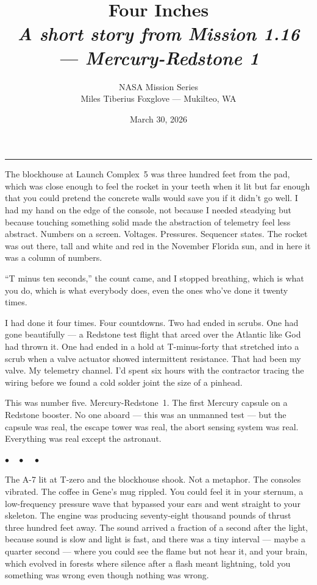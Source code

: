 \documentclass[12pt, letterpaper]{article}
\title{\Huge\textbf{Four Inches}\\[0.5em]\large\textit{A short story from Mission 1.16 --- Mercury-Redstone 1}}
\author{NASA Mission Series\\[0.3em]\small Miles Tiberius Foxglove --- Mukilteo, WA}
\date{March 30, 2026}
\begin{document}
\maketitle
\thispagestyle{empty}

\vspace{1em}
\noindent\rule{\textwidth}{0.4pt}
\vspace{1em}

\noindent The blockhouse at Launch Complex~5 was three hundred feet from the pad, which was close enough to feel the rocket in your teeth when it lit but far enough that you could pretend the concrete walls would save you if it didn't go well. I had my hand on the edge of the console, not because I needed steadying but because touching something solid made the abstraction of telemetry feel less abstract. Numbers on a screen. Voltages. Pressures. Sequencer states. The rocket was out there, tall and white and red in the November Florida sun, and in here it was a column of numbers.

``T minus ten seconds,'' the count came, and I stopped breathing, which is what you do, which is what everybody does, even the ones who've done it twenty times.

I had done it four times. Four countdowns. Two had ended in scrubs. One had gone beautifully --- a Redstone test flight that arced over the Atlantic like God had thrown it. One had ended in a hold at T-minus-forty that stretched into a scrub when a valve actuator showed intermittent resistance. That had been my valve. My telemetry channel. I'd spent six hours with the contractor tracing the wiring before we found a cold solder joint the size of a pinhead.

This was number five. Mercury-Redstone~1. The first Mercury capsule on a Redstone booster. No one aboard --- this was an unmanned test --- but the capsule was real, the escape tower was real, the abort sensing system was real. Everything was real except the astronaut.

\begin{center}
$\bullet\quad\bullet\quad\bullet$
\end{center}

The A-7 lit at T-zero and the blockhouse shook. Not a metaphor. The consoles vibrated. The coffee in Gene's mug rippled. You could feel it in your sternum, a low-frequency pressure wave that bypassed your ears and went straight to your skeleton. The engine was producing seventy-eight thousand pounds of thrust three hundred feet away. The sound arrived a fraction of a second after the light, because sound is slow and light is fast, and there was a tiny interval --- maybe a quarter second --- where you could see the flame but not hear it, and your brain, which evolved in forests where silence after a flash meant lightning, told you something was wrong even though nothing was wrong.
\end{document}
